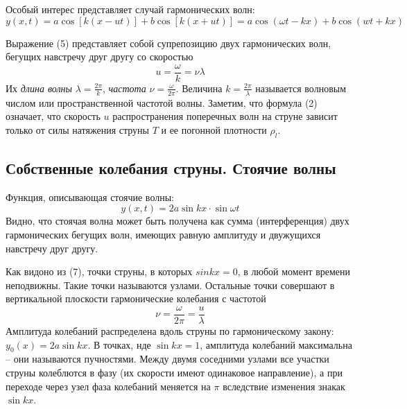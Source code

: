 \documentclass[a4paper,12pt]{article} %
\begin{document}
Особый интерес представляет случай гармонических волн:
\begin{equation}
y(x, t) = a\cos[k(x-ut)] + b\cos[k(x+ut)] = a\cos(\omega t-kx)+b\cos(wt+kx)
\end{equation}

Выражение (5) представляет собой супрепозицию двух гармонических волн, бегущих навстречу друг другу со скоростью
\begin{equation}
u = \frac{\omega}{k}=\nu\lambda
\end{equation}
Их \textit{длина волны} $\lambda = \frac{2\pi}{k}$, \textit{частота} $\nu = \frac{\omega}{2\pi}$. Величина $k = \frac{2\pi}{\lambda}$ называется волновым числом или пространственной частотой волны.
Заметим, что формула (2) означает, что скорость $u$ распространения поперечных волн на струне зависит только от силы натяжения струны $T$ и ее погонной плотности $\rho_l$.
\subsection{Собственные колебания струны. Стоячие волны}
Функция, описывающая стоячие волны:
\begin{equation}
y(x, t) = 2a \sin kx\cdot \sin\omega t
\end{equation}
Видно, что стоячая волна может быть получена как сумма (интерференция) двух гармонических бегущих волн, имеющих равную амплитуду и двужущихся навстречу друг другу.

Как видоно из (7), точки струны, в которых $sinkx = 0$, в любой момент времени неподвижны. Такие точки называются узлами. Остальные точки совершают в вертикальной плоскости гармонические колебания с частотой
\[\nu = \frac{\omega}{2\pi}=\frac{u}{\lambda}\]
Амплитуда колебаний распределена вдоль струны по гармоническому закону: $y_0(x) = 2a\sin kx$. В точках, нде $\sin kx = 1$, амплитуда колебаний максимальна -- они называются пучностями. Между двумя соседними узлами все участки струны колеблются в фазу (их скорости имеют одинаковое направление), а при переходе через узел фаза колебаний меняется на $\pi$ вследствие изменения знакак $\sin kx$.
\end{document}
